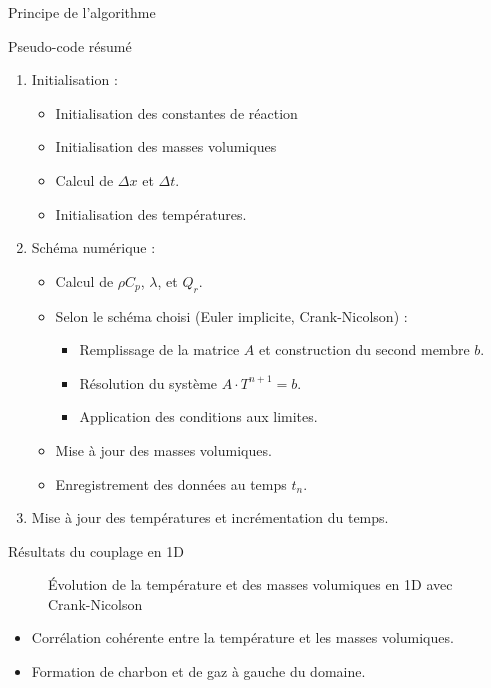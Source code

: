 \documentclass{beamer}
\begin{document}
\begin{frame}{Principe de l'algorithme}
    \begin{block}{Pseudo-code résumé}
        \begin{enumerate}
            \item Initialisation :
            \begin{itemize}
                \item Initialisation des constantes de réaction
                \item Initialisation des masses volumiques
                \item Calcul de $\Delta x$ et $\Delta t$.
                \item Initialisation des températures.
            \end{itemize}
            \item Schéma numérique :
            \begin{itemize}
                \item Calcul de $\rho C_p$, $\lambda$, et $Q_r$.
                \item Selon le schéma choisi (Euler implicite, Crank-Nicolson) :
                \begin{itemize}
                    \item Remplissage de la matrice $A$ et construction du second membre $b$.
                    \item Résolution du système $A \cdot T^{n+1} = b$.
                    \item Application des conditions aux limites.
                \end{itemize}
                \item Mise à jour des masses volumiques.
                \item Enregistrement des données au temps $t_n$.
            \end{itemize}
            \item Mise à jour des températures et incrémentation du temps.
        \end{enumerate}
    \end{block}
\end{frame}

\begin{frame}{Résultats du couplage en 1D}
    \begin{figure}
        \centering
        \caption{\centering \footnotesize Évolution de la température et des masses volumiques en 1D avec Crank-Nicolson}
    \end{figure}
    \begin{itemize}
        \item Corrélation cohérente entre la température et les masses volumiques.
        \item Formation de charbon et de gaz à gauche du domaine.
    \end{itemize}
\end{frame}
\end{document}
